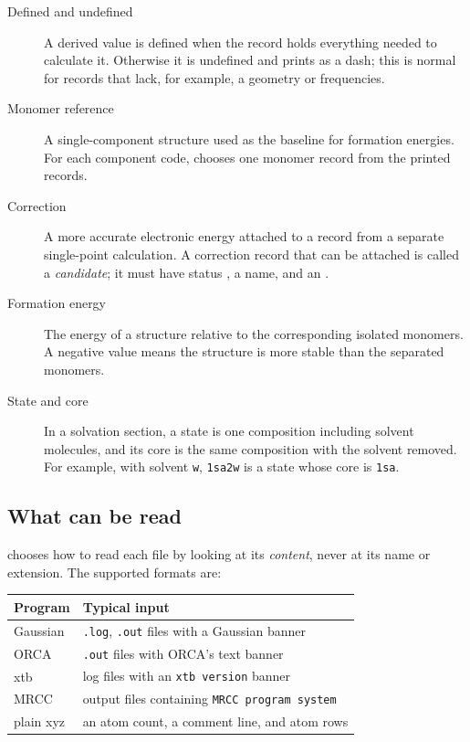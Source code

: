 \begin{description}
  \item[Defined and undefined] A derived value is defined when the record
        holds everything needed to calculate it. Otherwise it is undefined
        and prints as a dash; this is normal for records that lack, for
        example, a geometry or frequencies.
  \item[Monomer reference] A single-component structure used as the
        baseline for formation energies. For each component code, \CJKQC{}
        chooses one monomer record from the printed records.
  \item[Correction] A more accurate electronic energy attached to a record
        from a separate single-point calculation. A correction record that
        can be attached is called a \emph{candidate}; it must have status
        , a name, and an .
  \item[Formation energy] The energy of a structure relative to the
        corresponding isolated monomers. A negative value means the
        structure is more stable than the separated monomers.
  \item[State and core] In a solvation section, a state is one composition
        including solvent molecules, and its core is the same composition
        with the solvent removed. For example, with solvent \texttt{w},
        \texttt{1sa2w} is a state whose core is \texttt{1sa}.
\end{description}

\subsection{What can be read}

\CJKQC{} chooses how to read each file by looking at its \emph{content}, never
at its name or extension. The supported formats are:

\begin{center}
\begin{tabular}{@{}ll@{}}
\toprule
Program & Typical input \\
\midrule
Gaussian & \texttt{.log}, \texttt{.out} files with a Gaussian banner \\
ORCA     & \texttt{.out} files with ORCA's text banner \\
xtb      & log files with an \texttt{xtb version} banner \\
MRCC     & output files containing \texttt{MRCC program system} \\
plain xyz & an atom count, a comment line, and atom rows \\
\bottomrule
\end{tabular}
\end{center}

